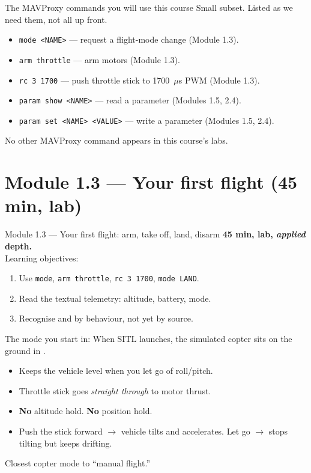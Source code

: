 \documentclass[aspectratio=169,11pt]{beamer}
\begin{document}
\begin{frame}{The MAVProxy commands you will use this course}
  Small subset. Listed as we need them, not all up front.
  \begin{itemize}
    \item \texttt{mode <NAME>} --- request a flight-mode change (Module 1.3).
    \item \texttt{arm throttle} --- arm motors (Module 1.3).
    \item \texttt{rc 3 1700} --- push throttle stick to 1700~$\mu$s PWM (Module 1.3).
    \item \texttt{param show <NAME>} --- read a parameter (Modules 1.5, 2.4).
    \item \texttt{param set <NAME> <VALUE>} --- write a parameter (Modules 1.5, 2.4).
  \end{itemize}
  No other MAVProxy command appears in this course's labs.
\end{frame}

\section{Module 1.3 --- Your first flight (45 min, lab)}

\begin{frame}{Module 1.3 --- Your first flight: arm, take off, land, disarm}
  \textbf{45 min, lab, \emph{applied} depth.}\\[1ex]
  Learning objectives:
  \begin{enumerate}
    \item Use \texttt{mode}, \texttt{arm throttle}, \texttt{rc 3 1700}, \texttt{mode LAND}.
    \item Read the textual telemetry: altitude, battery, mode.
    \item Recognise  and  by behaviour, not yet by source.
  \end{enumerate}
\end{frame}

\begin{frame}{The mode you start in: }
  When SITL launches, the simulated copter sits on the ground in .
  \begin{itemize}
    \item Keeps the vehicle level when you let go of roll/pitch.
    \item Throttle stick goes \emph{straight through} to motor thrust.
    \item \textbf{No} altitude hold. \textbf{No} position hold.
    \item Push the stick forward $\rightarrow$ vehicle tilts and accelerates. Let go $\rightarrow$ stops tilting but keeps drifting.
  \end{itemize}
  Closest copter mode to ``manual flight.''
\end{frame}
\end{document}
